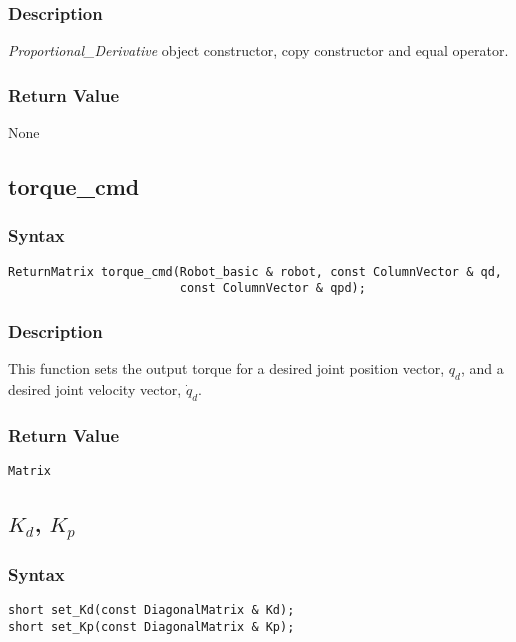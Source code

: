 \documentclass[11pt,fleqn,letterpaper]{report}
\begin{document}
\subsubsection*{Description}   
\emph{Proportional\_Derivative} object constructor, copy constructor
and equal operator.

\subsubsection*{Return Value}

None

\newpage

\subsection*{torque\_cmd}
\subsubsection*{Syntax}
\begin{verbatim}
ReturnMatrix torque_cmd(Robot_basic & robot, const ColumnVector & qd,
                        const ColumnVector & qpd);
\end{verbatim}

\subsubsection*{Description}   
This function sets the output torque for a desired joint position
vector, $q_d$, and a desired joint velocity vector, $\dot{q}_d$.

\subsubsection*{Return Value}

\texttt{Matrix}

\newpage

\subsection*{$K_d$, $K_p$}
\subsubsection*{Syntax}
\begin{verbatim}
short set_Kd(const DiagonalMatrix & Kd);
short set_Kp(const DiagonalMatrix & Kp);
\end{verbatim}
\end{document}
